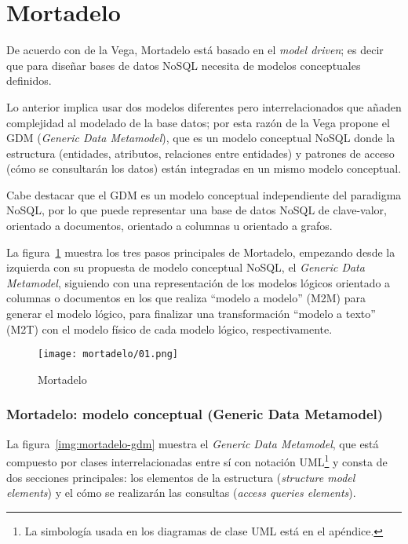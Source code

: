 \section{Mortadelo}
De acuerdo con de la Vega\cite{de_la_vega_mortadelo_2020}, Mortadelo está basado en el \textit{model driven}; es decir que para diseñar bases de datos NoSQL necesita de modelos conceptuales definidos.


Lo anterior implica usar dos modelos diferentes pero interrelacionados que añaden complejidad al modelado de la base datos; por esta razón de la Vega propone el GDM (\textit{Generic Data Metamodel}), que es un modelo conceptual NoSQL donde la estructura (entidades, atributos, relaciones entre entidades) y patrones de acceso (cómo se consultarán los datos) están integradas en un mismo modelo conceptual.


Cabe destacar que el GDM es un modelo conceptual independiente del paradigma NoSQL, por lo que puede representar una base de datos NoSQL de clave-valor, orientado a documentos, orientado a columnas u orientado a grafos.

La figura~\ref{img:mortadelo-process} muestra los tres pasos principales de Mortadelo, empezando desde la izquierda con su propuesta de modelo conceptual NoSQL, el \textit{Generic Data Metamodel}, siguiendo con una representación de los modelos lógicos orientado a columnas o documentos en los que realiza ``modelo a modelo'' (M2M) para generar el modelo lógico, para finalizar una transformación ``modelo a texto'' (M2T) con el modelo físico de cada modelo lógico, respectivamente.


\begin{figure}[H] 
    \centering
    \texttt{[image: mortadelo/01.png]}
    \caption{Mortadelo}
    \label{img:mortadelo-process}
\end{figure}
\subsubsection*{Mortadelo: modelo conceptual (Generic Data Metamodel)}

La figura~\ref{img:mortadelo-gdm} muestra el \textit{Generic Data Metamodel}, que está compuesto por clases interrelacionadas entre sí con notación UML\footnote{La simbología usada en los diagramas de clase UML está en el apéndice.} y consta de dos secciones principales: los elementos de la estructura (\textit{structure model elements}) y el cómo se realizarán las consultas (\textit{access queries elements}).


